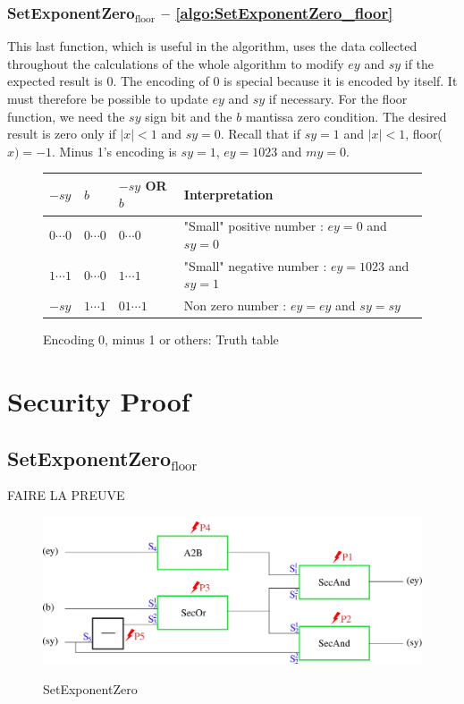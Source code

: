\documentclass[runningheads]{llncs}
\begin{document}
    \subsubsection{SetExponentZero$_\text{floor}$ -- \autoref{algo:SetExponentZero_floor}}

    This last function, which is useful in the algorithm, uses the data collected throughout the calculations of the whole algorithm to modify $ey$ and $sy$ if the expected result is 0.
      The encoding of $0$ is special because it is encoded by itself. It must therefore be possible to update $ey$ and $sy$ if necessary. 
      For the floor function, we need the $sy$ sign bit and the $b$ mantissa zero condition.
      The desired result is zero only if $\mid x \mid <1$ and $sy=0$. Recall that if $sy=1$ and $\mid x \mid <1$, floor($x)=-1$. 
      Minus 1's encoding is $sy = 1$, $ey = 1023$ and $my = 0$.

      \begin{figure}
        \begin{center}
            \begin{tabular}{C{1.2cm} C{1.2cm} || C{2 cm} C{7.5cm}}
                \hline $-sy$ & $b$ &$-sy$ OR $b$ & Interpretation\\
                \hline 
                $0\cdots0$ & $0\cdots0$ & $0\cdots0$ & "Small" positive number : $ey = 0$ and $sy = 0$  \\
                $1\cdots1$ & $0\cdots0$ & $1\cdots1$ & "Small" negative number : $ey = 1023$ and $sy = 1$\\ 
                $-sy$ & $1\cdots1$ & $01\cdots1$ & Non zero number : $ey = ey$ and $sy=sy$\\\hline
            \end{tabular}
        \end{center}
        \caption{Encoding 0, minus 1 or others: Truth table}
        \label{figure:flooradjust2}
    \end{figure}

\section{Security Proof}
\subsection{SetExponentZero$_\text{floor}$}

FAIRE LA PREUVE

\begin{figure}[h!]
  \centering
  \includegraphics[width=1\textwidth]{figure/SetExZero.pdf}
  \label{fig:SetExponentZero}
  \caption{SetExponentZero}
\end{figure}
\end{document}
